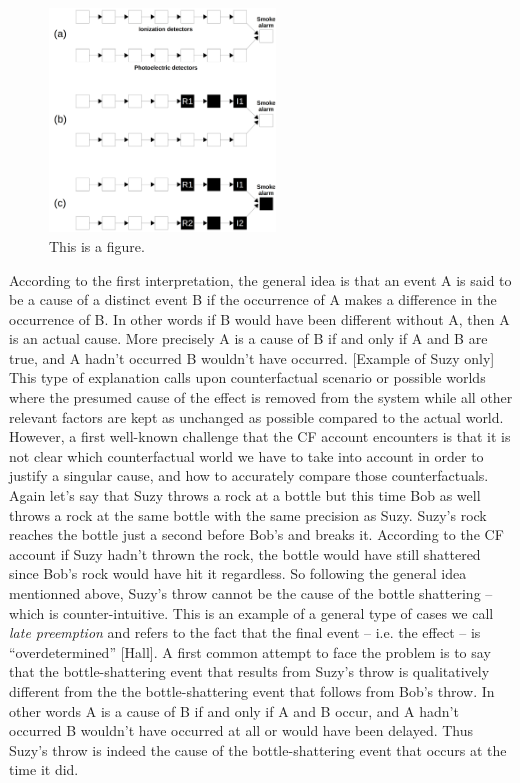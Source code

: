 \documentclass[10pt,letterpaper]{article}
\begin{document}
\begin{figure}[ht]
\begin{center}
\includegraphics[width=6cm]{intro}
\end{center}
\caption{This is a figure.} 
\label{fig:1}
\end{figure}

According to the first interpretation, the general idea is that an event A is said to be a cause of a distinct event B if the occurrence of A makes a difference in the occurrence of B. In other words if B would have been different without A, then A is an actual cause. More precisely A is a cause of B if and only if A and B are true, and A hadn't occurred B wouldn't have occurred. [Example of Suzy only] This type of explanation calls upon counterfactual scenario or possible worlds where the presumed cause of the effect is removed from the system while all other relevant factors are kept as unchanged as possible compared to the actual world. However, a first well-known challenge that the CF account encounters is that it is not clear which counterfactual world we have to take into account in order to justify a singular cause, and how to accurately compare those counterfactuals. Again let's say that Suzy throws a rock at a bottle but this time Bob as well throws a rock at the same bottle with the same precision as Suzy. Suzy's rock reaches the bottle just a second before Bob's and breaks it. According to the CF account if Suzy hadn't thrown the rock, the bottle would have still shattered since Bob's rock would have hit it regardless. So following the general idea mentionned above, Suzy's throw cannot be the cause of the bottle shattering -- which is counter-intuitive. This is an example of a general type of cases we call \textit{late preemption} and refers to the fact that the final event -- i.e. the effect -- is ``overdetermined'' [Hall]. A first common attempt to face the problem is to say that the bottle-shattering event that results from Suzy's throw is qualitatively different from the the bottle-shattering event that follows from Bob's throw. In other words A is a cause of B if and only if A and B occur, and A hadn't occurred B wouldn't have occurred at all or would have been delayed. Thus Suzy's throw is indeed the cause of the bottle-shattering event that occurs at the time it did. 
\end{document}
